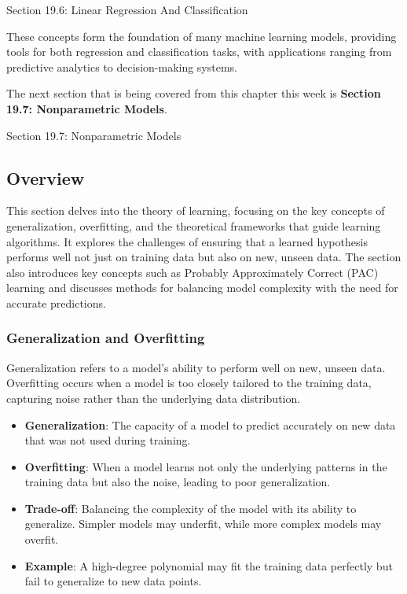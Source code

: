 \begin{notes}{Section 19.6: Linear Regression And Classification}
\begin{highlight}
        These concepts form the foundation of many machine learning models, providing tools for both regression and classification tasks, with applications ranging from predictive analytics to decision-making systems.
    
    \end{highlight}
\end{notes}

The next section that is being covered from this chapter this week is \textbf{Section 19.7: Nonparametric Models}.

\begin{notes}{Section 19.7: Nonparametric Models}
    \subsection*{Overview}

    This section delves into the theory of learning, focusing on the key concepts of generalization, overfitting, and the theoretical frameworks that guide learning algorithms. It explores the challenges 
    of ensuring that a learned hypothesis performs well not just on training data but also on new, unseen data. The section also introduces key concepts such as Probably Approximately Correct (PAC) 
    learning and discusses methods for balancing model complexity with the need for accurate predictions.
    
    \subsubsection*{Generalization and Overfitting}
    
    Generalization refers to a model's ability to perform well on new, unseen data. Overfitting occurs when a model is too closely tailored to the training data, capturing noise rather than the underlying 
    data distribution.
    
    \begin{highlight}
    
        \begin{itemize}
            \item \textbf{Generalization}: The capacity of a model to predict accurately on new data that was not used during training.
            \item \textbf{Overfitting}: When a model learns not only the underlying patterns in the training data but also the noise, leading to poor generalization.
            \item \textbf{Trade-off}: Balancing the complexity of the model with its ability to generalize. Simpler models may underfit, while more complex models may overfit.
            \item \textbf{Example}: A high-degree polynomial may fit the training data perfectly but fail to generalize to new data points.
        \end{itemize}
    

\end{highlight}
\end{notes}
